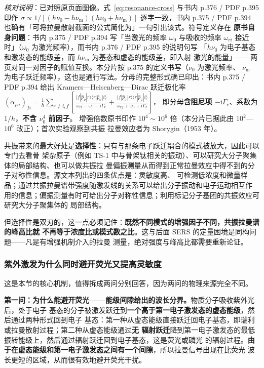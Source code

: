 \begin{principle}
\emph{核对说明}：已对照原页面图像。式~\eqref{eq:resonance-cross} 与书内 p.376 / PDF p.395 印作
$\sigma\propto 1/[(h\nu_0-h\nu_{\mathrm{m}})(h\nu_0+h\nu_{\mathrm{m}})]$ 逐字一致，书内
p.375 / PDF p.394 也确有「可将拉曼散射截面的公式简化为」一句引出该式。符号定义存在
\textbf{原书自身问题}：书内 p.375 / PDF p.394 写「当激光的频率 $\omega_0$ 与吸收的频率
$\omega_{ri}$ 接近时」（$\omega_0$ 为激光频率），而书内 p.376 / PDF p.395 的说明句写
「$h\nu_0$ 为电子基态和激发态的能级差，而 $h\nu_{\mathrm{m}}$ 为基态和虚态的能级差，即入射
激光的能量」——两页对同一对因子的赋值互换。本分片按 p.375 的定义书写（$\nu_0$ 为激光频率、
$\nu_{\mathrm{m}}$ 为电子跃迁频率），这也是通行写法。分母的完整形式确已印出：书内 p.375 /
PDF p.394 给出 Kramers—Heisenberg—Dirac 跃迁极化率
$(\tilde{\alpha}_{\rho\sigma})_{fi}=\frac{1}{h}\sum_{r\neq i,f}\left[\frac{\langle f|\hat{p}_{\rho}|r\rangle\langle r|\hat{p}_{\sigma}|i\rangle}{\omega_{ri}-\omega_0-\mathrm{i}\Gamma_r}+\frac{\langle f|\hat{p}_{\sigma}|r\rangle\langle r|\hat{p}_{\rho}|i\rangle}{\omega_{rf}+\omega_0+\mathrm{i}\Gamma_r}\right]$，
即分母\textbf{含阻尼项 $-\mathrm{i}\Gamma_r$}、系数为 $1/h$，\textbf{不含 $\nu_0^4$ 前因子}。
增强倍数原书印作 $10^4\sim10^6$ 倍（本分片已据此由 $10^2$—$10^6$ 改正）；首次实验观察到共振
拉曼效应者为 Shorygin（1953 年）。
\end{principle}

共振带来的最大好处是\textbf{选择性}：只有与那条电子跃迁耦合的模式被放大，因此可以专门去看骨
架杂原子（例如 TS-1 中与骨架钛相关的振动）、可以研究大分子聚集体的局部结构、也可以做共振拉
曼偏振测量从而得到正常拉曼效应中得不到的分子对称性信息。源文本列出的四条优点是：灵敏度高、
可检测低浓度和微量样品；通过共振拉曼谱带强度随激发线的关系可以给出分子振动和电子运动相互作
用的信息；偏振测量有时可给出分子对称性信息；利用标记分子基团的共振效应可研究大分子聚集体的
局部结构。

但选择性是双刃的，这一点必须记住：\textbf{既然不同模式的增强因子不同，共振拉曼谱的峰高比就
不再等于浓度比或模式数之比}。这与后面 SERS 的定量困境是同构问题——凡是有增强机制介入的拉曼
测量，绝对强度与峰高比都需要重新论证。

\subsubsection{紫外激发为什么同时避开荧光又提高灵敏度}
\label{sec:ch06b-uvmechanism}

这是本节的核心机制，值得拆成两问分别回答，因为两问的物理来源完全不同。

\textbf{第一问：为什么能避开荧光——能级间隙给出的波长分界。}物质分子吸收紫外光后，处于电子
基态的分子被激发跃迁到\textbf{一个高于第一电子激发态的虚态能级}，然后通过两种形式回到电子
基态：第一种从虚态能级直接跃迁回电子基态，即瑞利或拉曼散射过程；第二种从虚态能级通过\textbf{无
辐射跃迁}降到第一电子激发态的最低振转能级上，然后通过辐射跃迁回到电子基态，这是荧光或磷光
的辐射过程。\textbf{由于在虚态能级和第一电子激发态之间有一个间隙}，所以拉曼信号出现在比荧光
波长更短的区域，从而很有效地避开荧光干扰。


